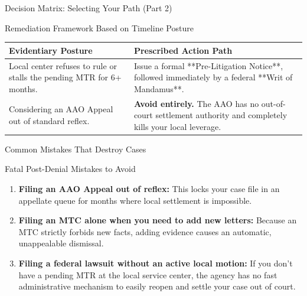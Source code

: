 \documentclass[11pt]{beamer}
\begin{document}
	\begin{frame}{Decision Matrix: Selecting Your Path (Part 2)}
		\scriptsize
		\begin{block}{Remediation Framework Based on Timeline Posture}
			\centering
			\begin{tabular}{|p{4cm}|p{6.5cm}|}
				\hline
				\textbf{Evidentiary Posture} & \textbf{Prescribed Action Path} \\
				\hline
				Local center refuses to rule or stalls the pending MTR for 6+ months. & Issue a formal **Pre-Litigation Notice**, followed immediately by a federal **Writ of Mandamus**. \\
				\hline
				Considering an AAO Appeal out of standard reflex. & \textbf{Avoid entirely.} The AAO has no out-of-court settlement authority and completely kills your local leverage. \\
				\hline
			\end{tabular}
		\end{block}
	\end{frame}
	
	\begin{frame}{Common Mistakes That Destroy Cases}
		\scriptsize
		\begin{block}{Fatal Post-Denial Mistakes to Avoid}
			\begin{enumerate}
				\item \textbf{Filing an AAO Appeal out of reflex:} This locks your case file in an appellate queue for months where local settlement is impossible.
				\item \textbf{Filing an MTC alone when you need to add new letters:} Because an MTC strictly forbids new facts, adding evidence causes an automatic, unappealable dismissal.
				\item \textbf{Filing a federal lawsuit without an active local motion:} If you don't have a pending MTR at the local service center, the agency has no fast administrative mechanism to easily reopen and settle your case out of court.
			\end{enumerate}
		\end{block}
	\end{frame}
	
\end{document}
